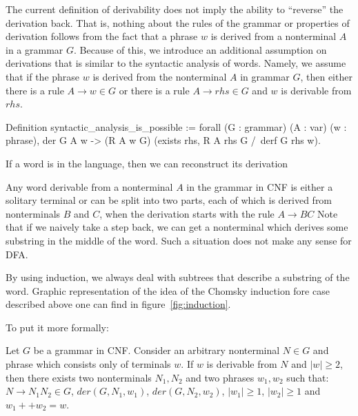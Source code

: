 The current definition of derivability does not imply the ability to ``reverse'' the derivation back. That is, nothing about the rules of the grammar or properties of derivation follows from the fact that a phrase $w$ is derived from a nonterminal $A$ in a grammar $G$. Because of this, we introduce an additional assumption on derivations that is similar to the syntactic analysis of words.
Namely, we assume that if the phrase $w$ is derived from the nonterminal $A$ in grammar $G$, then either there is a rule $A \to w \in G$ or there is a rule $A \to rhs \in G$ and $w$ is derivable from $rhs$.

\begin{listing}[h]
    \begin{pyglist}[language=coq, numbers=none, numbersep=5pt]
Definition syntactic_analysis_is_possible :=
  forall (G : grammar) (A : var) (w : phrase),
  der G A w ->
   (R A w \in G) \/ 
   (exists rhs, R A rhs \in G /\ derf G rhs w).
  
  \end{pyglist}
    \caption{If a word is in the language, then we can reconstruct its derivation}
    \label{lst:synt-analysis-is-possible}
\end{listing}

Any word derivable from a nonterminal $A$ in the grammar in CNF is either a solitary terminal or can be split into two parts, each of which is derived from nonterminals $B$ and $C$, when the derivation starts with the rule $A \to B C$
Note that if we naively take a step back, we can get a nonterminal which derives some substring in the middle of the word. 
Such a situation does not make any sense for DFA.

By using induction, we always deal with subtrees that describe a substring of the word.
Graphic representation of the idea of the Chomsky induction fore case described above one can find in figure~\ref{fig:induction}.


To put it more formally: 
\begin{lemma} \label{lemma:chomskyind1}
Let $G$ be a grammar in CNF. Consider an arbitrary nonterminal $N \in G$ and phrase which consists only of terminals $w$. 
If $w$ is derivable from $N$ and $|w| \ge 2$, then there exists two nonterminals $N_1, N_2$ and two phrases $w_1, w_2$ such that: $N \to N_1 N_2 \in G$, $der(G, N_1, w_1)$, $der(G, N_2, w_2)$, $|w_1| \ge 1$, $|w_2| \ge 1$ and $w_1 ++ w_2 = w$.
\end{lemma}


